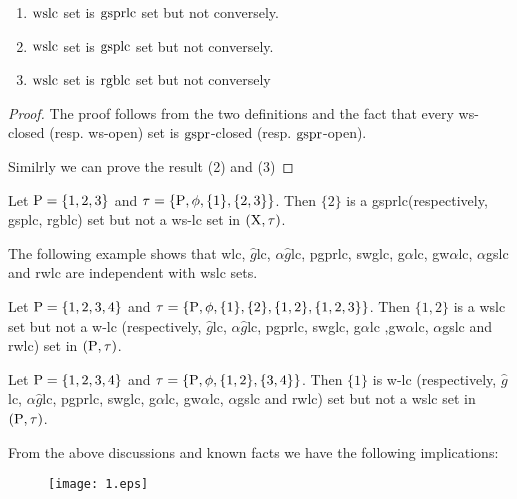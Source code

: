 \begin{thm}\label{thm7.2.8}
\begin{enumerate}[(1)]
\item $\mathrm{wslc}$ set is $\mathrm{gsprlc}$ set but not conversely.
\item $\mathrm{wslc}$ set is $\mathrm{gsplc}$ set but not conversely.
\item $\mathrm{wslc}$ set is $\mathrm{rgblc}$ set but not conversely
\end{enumerate}
\end{thm}

\begin{proof}
The proof follows from the two definitions and the fact that every ws-closed (resp. ws-open) set is $\mathrm{gspr}$-closed (resp. $\mathrm{gspr}$-open).

Similrly we can prove the result (2) and (3)
\end{proof}

\begin{exm}\label{exam7.2.9}
Let $\mathrm{P}= \{1,2, 3\}$ and $\tau=\{\mathrm{P}, \phi, \{1\}, \{2,3\}\}$. Then $\{2\}$ is a gsprlc(respectively, gsplc, rgblc) set but not a ws-lc set in $(\mathrm{X}, \tau)$.
\end{exm}

\begin{rem}\label{rem7.2.2}
The following example shows that wlc, $\hat{g}$lc, $\alpha\hat{g}$lc, pgprlc, swglc, g$\alpha$lc, gw$\alpha$lc, $\alpha$gslc and rwlc are independent with wslc sets.
\end{rem}

\begin{exm}\label{exam7.2.10}
Let $\mathrm{P}= \{1, 2, 3, 4\}$ and $\tau=\{\mathrm{P}, \phi, \{1\}, \{2\}, \{1, 2\}, \{1, 2, 3\}\}$. Then $\{1, 2\}$ is a wslc set but not a w-lc (respectively, $\hat{g}$lc, $\alpha\hat{g}$lc, pgprlc, swglc, g$\alpha$lc ,gw$\alpha$lc, $\alpha$gslc and rwlc) set in $(\mathrm{P}, \tau)$.
\end{exm}

\begin{exm}\label{exam7.2.11}
Let $\mathrm{P}= \{1,2,3, 4\}$ and $\tau=\{\mathrm{P}, \phi, \{1, 2\}, \{3,4\}\}$. Then $\{1\}$ is w-lc (respectively, $\hat{g}$lc, $\alpha\hat{g}$lc, pgprlc, swglc, g$\alpha$lc, gw$\alpha$lc, $\alpha$gslc and rwlc) set but not a wslc set in $(\mathrm{P}, \tau)$.
\end{exm}

\begin{rem}\label{rem7.2.3}
From the above discussions and known facts we have the following implications:
\begin{figure}[H]
\centering
\texttt{[image: 1.eps]}
\end{figure}
\end{rem}

